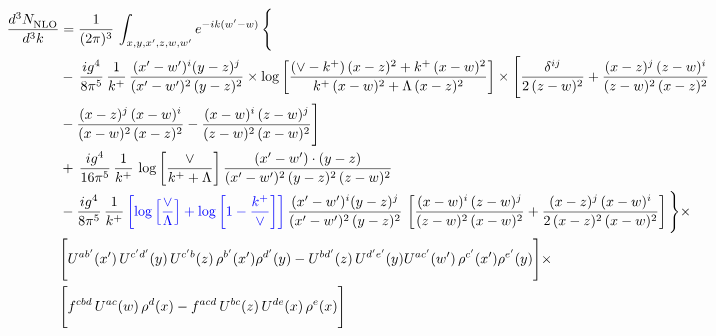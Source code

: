 \documentclass[9pt]{article}
\numberwithin{equation}{section}
\begin{document}
\begin{align}
     \frac{d^{3}N_{\rm NLO}^{\rm}}{d^{3}k}  & =  \frac{1}{(2\pi)^{3}}\, \int_{x,y,x',z,w,w^{\prime}} e^{-ik(w^{\prime}-w)}\, \Bigg\{\notag \\ & -\,\frac{ig^{4}}{8\pi^{5}}\,\frac{1}{k^{+}}\,\frac{(x'-w')^{i}(y-z)^{j}}{(x'-w')^{2}\,(y-z)^{2}}\times \log{\left[\frac{(\vee-k^{+})\,(x-z)^{2}+k^{+}\,(x-w)^{2}}{k^{+}\,(x-w)^{2}+\Lambda\, (x-z)^{2}}\right]}\times \Bigg[\frac{\delta^{ij}}{2\,(z-w)^{2}}+\frac{(x-z)^{j}\,(z-w)^{i}}{(z-w)^{2}\,(x-z)^{2}}\notag \\ & -\frac{(x-z)^{j}\,(x-w)^{i}}{(x-w)^{2}\,(x-z)^{2}}-\frac{(x-w)^{i}\,(z-w)^{j}}{(z-w)^{2}\,(x-w)^{2}}\Bigg]\notag \\ & +\,\frac{ig^{4}}{16\pi^{5}}\,\frac{1}{k^{+}}\,\log{\left[\frac{\vee}{k^{+}+\Lambda}\right]}\, \frac{(x'-w')\cdot (y-z)}{(x'-w')^{2}\,(y-z)^{2}\,(z-w)^{2}}\notag \\ & -\frac{ig^{4}}{8\pi^{5}}\,\frac{1}{k^{+}}\,{\color{blue}\left[\log{\left[\frac{\vee}{\Lambda}\right]} + \log{\left[1-\frac{k^{+}}{\vee}\right]}\right]}\,\frac{(x'-w')^{i}(y-z)^{j}}{(x'-w')^{2}\,(y-z)^{2}}\,\left[\frac{(x-w)^{i}\,(z-w)^{j}}{(z-w)^{2}\,(x-w)^{2}}+\frac{(x-z)^{j}\,(x-w)^{i}}{2\,(x-z)^{2}\, (x-w)^{2}}\right]\Bigg\}\times \notag \\ &  \Bigg[U^{ab'}(x')\,U^{c'd'}(y)\,U^{c'b}(z)\,\rho^{b'}(x')\rho^{d'}(y)-U^{bd'}(z)\,U^{d'e'}(y)U^{ac'}(w')\,\rho^{c'}(x')\rho^{e'}(y)\Bigg]\times\notag \\ & \Bigg[f^{cbd}\,U^{ac}(w)\,\rho^{d}(x)-f^{acd}\, U^{bc}(z)\,U^{de}(x)\,\rho^{e}(x)\Bigg] 
\end{align}
\end{document}
